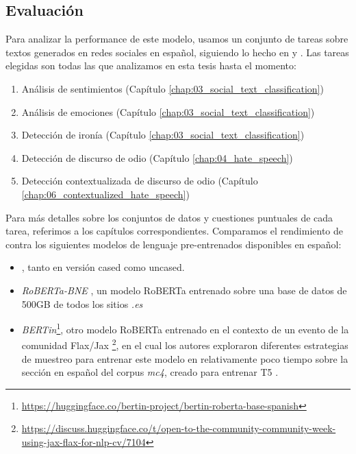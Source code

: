 \subsection{Evaluación}

Para analizar la performance de este modelo, usamos un conjunto de tareas sobre textos generados en redes sociales en español, siguiendo lo hecho en \citet{gonzalez2021twilbert} y \citet{polignano2019alberto}. Las tareas elegidas son todas las que analizamos en esta tesis hasta el momento:

\begin{enumerate}
    \item Análisis de sentimientos (Capítulo \ref{chap:03_social_text_classification})
    \item Análisis de emociones (Capítulo \ref{chap:03_social_text_classification})
    \item Detección de ironía (Capítulo \ref{chap:03_social_text_classification})
    \item Detección de discurso de odio (Capítulo \ref{chap:04_hate_speech})
    \item Detección contextualizada de discurso de odio (Capítulo \ref{chap:06_contextualized_hate_speech})
\end{enumerate}


Para más detalles sobre los conjuntos de datos y cuestiones puntuales de cada tarea, referimos a los capítulos correspondientes. Comparamos el rendimiento de \robertuito{} contra los siguientes modelos de lenguaje pre-entrenados disponibles en español:

\begin{itemize}
    \item \beto{} \cite{canete2020spanish}, tanto en versión cased como uncased.
    \item \emph{RoBERTa-BNE} \cite{gutierrezfandino2021spanish}, un modelo RoBERTa entrenado sobre una base de datos de 500GB de todos los sitios \emph{.es}
    \item \emph{BERTin}\footnote{\url{https://huggingface.co/bertin-project/bertin-roberta-base-spanish}}, otro modelo RoBERTa entrenado en el contexto de un evento de la comunidad Flax/Jax \footnote{\url{https://discuss.huggingface.co/t/open-to-the-community-community-week-using-jax-flax-for-nlp-cv/7104}}, en el cual los autores exploraron diferentes estrategias de muestreo para entrenar este modelo en relativamente poco tiempo sobre la sección en español del corpus \emph{mc4}, creado para entrenar T5 \cite{raffel2020exploringt5}.
\end{itemize}

